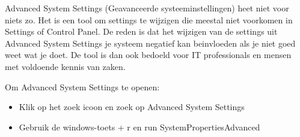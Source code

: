 Advanced System Settings (Geavanceerde systeeminstellingen) heet niet voor niets zo. Het is een tool om settings te wijzigen die meestal niet voorkomen in Settings of Control Panel. De reden is dat het wijzigen van de settings uit Advanced System Settings je systeem negatief kan beinvloeden als je niet goed weet wat je doet. De tool is dan ook bedoeld voor IT professionals en mensen met voldoende kennis van zaken.

Om Advanced System Settings te openen:
\begin{itemize}
\item Klik op het zoek icoon en zoek op Advanced System Settings
\item Gebruik de windows-toets + r en run SystemPropertiesAdvanced
\end{itemize}

\begin{minipage}[t]{\linewidth}
\raggedright
{}
\end{minipage}

